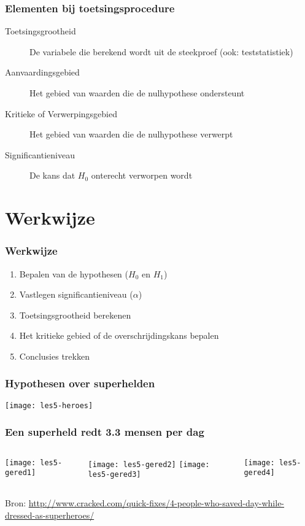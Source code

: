 \documentclass[aspectratio=169]{beamer}
\begin{document}
\begin{frame}
  \frametitle{Elementen bij toetsingsprocedure}
  
  \begin{description}
    \item[Toetsingsgrootheid] De variabele die berekend wordt uit de steekproef (ook: teststatistiek)
    \item[Aanvaardingsgebied] Het gebied van waarden die de nulhypothese \alert{ondersteunt}
    \item[Kritieke of Verwerpingsgebied] Het gebied van waarden die de nulhypothese \alert{verwerpt}
    \item[Significantieniveau] De kans dat $H_0$ \alert{onterecht} verworpen wordt
  \end{description}
\end{frame}

\section{Werkwijze}

\begin{frame}
  \frametitle{Werkwijze}
  
  \begin{enumerate}
    \item Bepalen van de hypothesen ($H_0$ en $H_1$)
    \item Vastlegen significantieniveau ($\alpha$)
    \item Toetsingsgrootheid berekenen
    \item Het kritieke gebied of de overschrijdingskans bepalen
    \item Conclusies trekken
  \end{enumerate}
\end{frame}

\begin{frame}[plain]
  \frametitle{Hypothesen over superhelden}
  \centering
  \texttt{[image: les5-heroes]}
\end{frame}

\begin{frame}
  \frametitle{Een superheld redt 3.3 mensen per dag}
  
  \begin{columns}
    \centering
    \texttt{[image: les5-gered1]}
    
    \texttt{[image: les5-gered2]}
    \centering
    \texttt{[image: les5-gered3]}
    
    \texttt{[image: les5-gered4]}
  \end{columns}
  
  \vfill
  \centering
  \small{Bron: \url{http://www.cracked.com/quick-fixes/4-people-who-saved-day-while-dressed-as-superheroes/}}
\end{frame}
\end{document}

